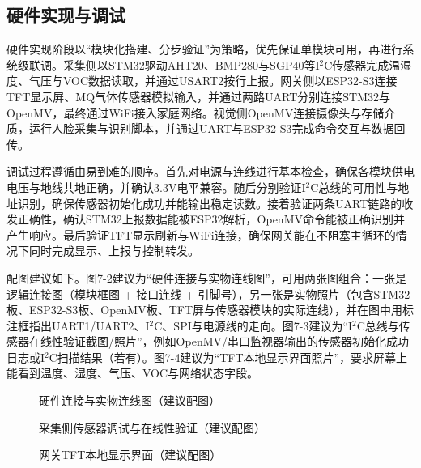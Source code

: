 \subsection{硬件实现与调试}
\par 硬件实现阶段以“模块化搭建、分步验证”为策略，优先保证单模块可用，再进行系统级联调。采集侧以STM32驱动AHT20、BMP280与SGP40等I\(^2\)C传感器完成温湿度、气压与VOC数据读取，并通过USART2按行上报。网关侧以ESP32-S3连接TFT显示屏、MQ气体传感器模拟输入，并通过两路UART分别连接STM32与OpenMV，最终通过WiFi接入家庭网络。视觉侧OpenMV连接摄像头与存储介质，运行人脸采集与识别脚本，并通过UART与ESP32-S3完成命令交互与数据回传。
\par 调试过程遵循由易到难的顺序。首先对电源与连线进行基本检查，确保各模块供电电压与地线共地正确，并确认3.3V电平兼容。随后分别验证I\(^2\)C总线的可用性与地址识别，确保传感器初始化成功并能输出稳定读数。接着验证两条UART链路的收发正确性，确认STM32上报数据能被ESP32解析，OpenMV命令能被正确识别并产生响应。最后验证TFT显示刷新与WiFi连接，确保网关能在不阻塞主循环的情况下同时完成显示、上报与控制转发。
\par 配图建议如下。图7-2建议为“硬件连接与实物连线图”，可用两张图组合：一张是逻辑连接图（模块框图 + 接口连线 + 引脚号），另一张是实物照片（包含STM32板、ESP32-S3板、OpenMV板、TFT屏与传感器模块的实际连线），并在图中用标注框指出UART1/UART2、I\(^2\)C、SPI与电源线的走向。图7-3建议为“I\(^2\)C总线与传感器在线性验证截图/照片”，例如OpenMV/串口监视器输出的传感器初始化成功日志或I\(^2\)C扫描结果（若有）。图7-4建议为“TFT本地显示界面照片”，要求屏幕上能看到温度、湿度、气压、VOC与网络状态字段。
\begin{figure}[H]
\centering
{}
\caption{硬件连接与实物连线图（建议配图）}
\label{fig:hardware_wiring}
\end{figure}
\begin{figure}[H]
\centering
{}
\caption{采集侧传感器调试与在线性验证（建议配图）}
\label{fig:sensor_debug}
\end{figure}
\begin{figure}[H]
\centering
{}
\caption{网关TFT本地显示界面（建议配图）}
\label{fig:tft_ui}
\end{figure}

